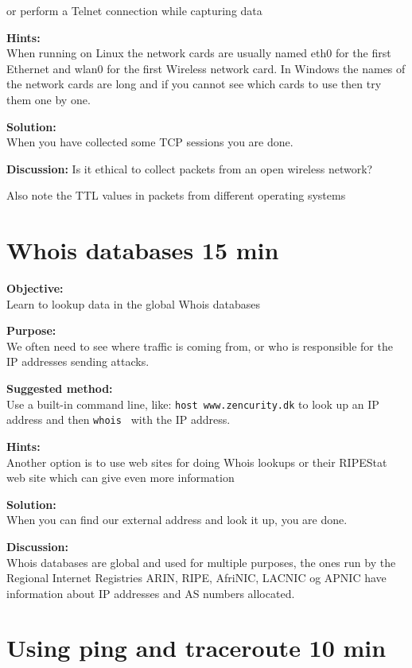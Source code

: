 \documentclass[a4paper,11pt,notitlepage]{report}
\begin{document}
or perform a Telnet connection while capturing data

{\bf Hints:}\\
When running on Linux the network cards are usually named eth0 for the first Ethernet and wlan0 for the first Wireless network card. In Windows the names of the network cards are long and if you cannot see which cards to use then try them one by one.

{\bf Solution:}\\
When you have collected some TCP sessions you are done.

{\bf Discussion:}
Is it ethical to collect packets from an open wireless network?

Also note the TTL values in packets from different operating systems

\chapter{Whois databases 15 min}
\label{ex:whois}

{\bf Objective:}\\
Learn to lookup data in the global Whois databases

{\bf Purpose:}\\
We often need to see where traffic is coming from, or who is responsible for the IP addresses sending attacks.

{\bf Suggested method:}\\
Use a built-in command line, like: \verb+host www.zencurity.dk+ to look up an IP address and then \verb+whois + with the IP address.

{\bf Hints:}\\
Another option is to use web sites for doing Whois lookups  or their RIPEStat web site which can give even more information

{\bf Solution:}\\
When you can find our external address and look it up, you are done.

{\bf Discussion:}\\
Whois databases are global and used for multiple purposes, the ones run by the Regional Internet Registries ARIN, RIPE, AfriNIC, LACNIC og APNIC have information about IP addresses and AS numbers allocated.

\chapter{Using ping and traceroute 10 min}
\label{ex:ping}
\end{document}
